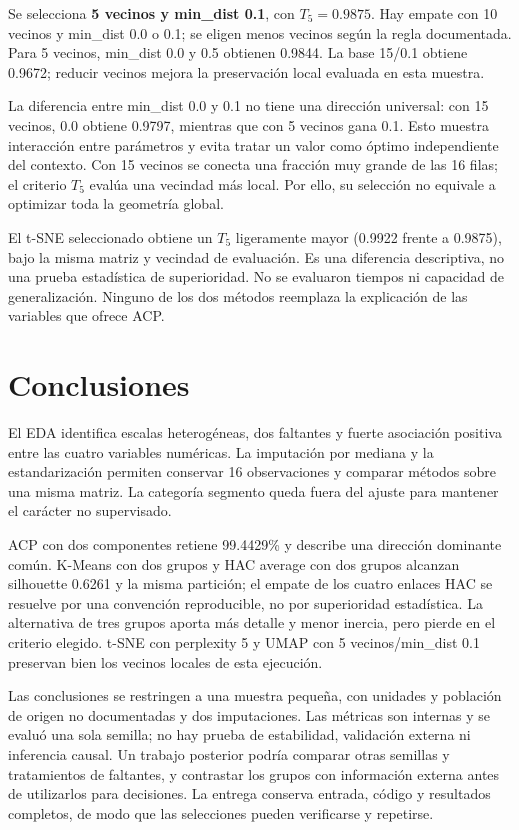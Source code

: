 \documentclass[11pt]{article}
\begin{document}
Se selecciona \textbf{5 vecinos y min\_dist 0.1}, con $T_5=0.9875$.
Hay empate con 10 vecinos y min\_dist 0.0 o 0.1; se eligen menos vecinos
según la regla documentada. Para 5 vecinos, min\_dist 0.0 y 0.5 obtienen
0.9844. La base 15/0.1 obtiene 0.9672; reducir vecinos mejora la
preservación local evaluada en esta muestra.

La diferencia entre min\_dist 0.0 y 0.1 no tiene una dirección universal:
con 15 vecinos, 0.0 obtiene 0.9797, mientras que con 5 vecinos gana 0.1.
Esto muestra interacción entre parámetros y evita tratar un valor como
óptimo independiente del contexto. Con 15 vecinos se conecta una fracción
muy grande de las 16 filas; el criterio $T_5$ evalúa una vecindad más local.
Por ello, su selección no equivale a optimizar toda la geometría global.

El t-SNE seleccionado obtiene un $T_5$ ligeramente mayor (0.9922 frente a
0.9875), bajo la misma matriz y vecindad de evaluación. Es una diferencia
descriptiva, no una prueba estadística de superioridad. No se evaluaron
tiempos ni capacidad de generalización. Ninguno de los dos métodos
reemplaza la explicación de las variables que ofrece ACP.
\FloatBarrier

\section{Conclusiones}
El EDA identifica escalas heterogéneas, dos faltantes y fuerte asociación
positiva entre las cuatro variables numéricas. La imputación por mediana y
la estandarización permiten conservar 16 observaciones y comparar métodos
sobre una misma matriz. La categoría segmento queda fuera del ajuste para
mantener el carácter no supervisado.

ACP con dos componentes retiene 99.4429\% y describe una dirección dominante
común. K-Means con dos grupos y HAC average con dos grupos alcanzan
silhouette 0.6261 y la misma partición; el empate de los cuatro enlaces
HAC se resuelve por una convención reproducible, no por superioridad
estadística. La alternativa de tres grupos aporta más detalle y menor
inercia, pero pierde en el criterio elegido. t-SNE con perplexity 5 y UMAP
con 5 vecinos/min\_dist 0.1 preservan bien los vecinos locales de esta
ejecución.

Las conclusiones se restringen a una muestra pequeña, con unidades y
población de origen no documentadas y dos imputaciones. Las métricas son
internas y se evaluó una sola semilla; no hay prueba de estabilidad,
validación externa ni inferencia causal. Un trabajo posterior podría
comparar otras semillas y tratamientos de faltantes, y contrastar los
grupos con información externa antes de utilizarlos para decisiones.
La entrega conserva entrada, código y resultados completos, de modo que
las selecciones pueden verificarse y repetirse.
\clearpage
\end{document}
